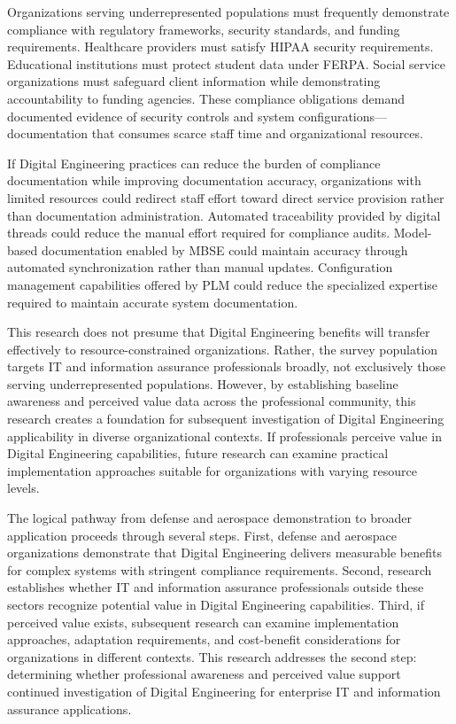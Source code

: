 Organizations serving underrepresented populations must frequently demonstrate compliance with regulatory frameworks, security standards, and funding requirements. Healthcare providers must satisfy HIPAA security requirements. Educational institutions must protect student data under FERPA\@. Social service organizations must safeguard client information while demonstrating accountability to funding agencies. These compliance obligations demand documented evidence of security controls and system configurations---documentation that consumes scarce staff time and organizational resources.

If Digital Engineering practices can reduce the burden of compliance documentation while improving documentation accuracy, organizations with limited resources could redirect staff effort toward direct service provision rather than documentation administration. Automated traceability provided by digital threads could reduce the manual effort required for compliance audits. Model-based documentation enabled by MBSE could maintain accuracy through automated synchronization rather than manual updates. Configuration management capabilities offered by PLM could reduce the specialized expertise required to maintain accurate system documentation.

This research does not presume that Digital Engineering benefits will transfer effectively to resource-constrained organizations. Rather, the survey population targets IT and information assurance professionals broadly, not exclusively those serving underrepresented populations. However, by establishing baseline awareness and perceived value data across the professional community, this research creates a foundation for subsequent investigation of Digital Engineering applicability in diverse organizational contexts. If professionals perceive value in Digital Engineering capabilities, future research can examine practical implementation approaches suitable for organizations with varying resource levels.

The logical pathway from defense and aerospace demonstration to broader application proceeds through several steps. First, defense and aerospace organizations demonstrate that Digital Engineering delivers measurable benefits for complex systems with stringent compliance requirements. Second, research establishes whether IT and information assurance professionals outside these sectors recognize potential value in Digital Engineering capabilities. Third, if perceived value exists, subsequent research can examine implementation approaches, adaptation requirements, and cost-benefit considerations for organizations in different contexts. This research addresses the second step: determining whether professional awareness and perceived value support continued investigation of Digital Engineering for enterprise IT and information assurance applications.

